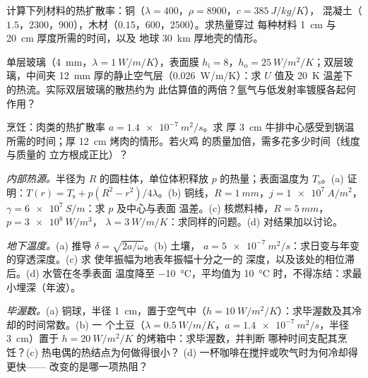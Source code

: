 \begin{exercise}[$\star$]\label{exo:b2:heat-conduction:2}
计算下列材料的热扩散率：铜（$\lambda = 400$，$\rho = 8900$，$c = \qty{385}{J/kg/K}$），
混凝土（$1.5$，$2300$，$900$），木材（$0.15$，$600$，$2500$）。求热量穿过
每种材料 \qty{1}{cm} 与 \qty{20}{cm} 厚度所需的时间，以及
地球 \qty{30}{km} 厚地壳的情形。
\end{exercise}

\begin{exercise}[$\star$]\label{exo:b2:heat-conduction:3}
单层玻璃（\qty{4}{mm}，$\lambda = \qty{1}{W/m/K}$），表面膜 $h_{\text{i}}
= 8$，$h_{\text{o}} = \qty{25}{W/m^2/K}$；双层玻璃，中间夹 \qty{12}{mm}
厚的静止空气层（\qty{0.026}{W/m/K}）：求 $U$ 值及
\qty{20}{K} 温差下的热流。实际双层玻璃的散热约为
此估算值的两倍？氩气与低发射率镀膜各起何作用？
\end{exercise}

\begin{exercise}[$\star$]\label{exo:b2:heat-conduction:4}
烹饪：肉类的热扩散率 $a = \qty{1.4e-7}{m^2/s}$。求
厚 \qty{3}{cm} 牛排中心感受到锅温所需的时间；厚 \qty{12}{cm} 烤肉的情形。若火鸡
的质量加倍，需多花多少时间（线度与质量的
立方根成正比）？
\end{exercise}

\begin{exercise}[$\star\star$]\label{exo:b2:heat-conduction:5}
\emph{内部热源。}半径为 $R$ 的圆柱体，单位体积释放 $p$
的热量；表面温度为 $T_{\text{s}}$。(a) 证明：$T(r) = T_{\text{s}} +
p(R^2 - r^2)/4\lambda$。(b) 铜线，$R = \qty{1}{mm}$，$j =
\qty{1e7}{A/m^2}$，$\gamma = \qty{6e7}{S/m}$：求 $p$ 及中心与表面
温差。(c) 核燃料棒，$R = \qty{5}{mm}$，$p = \qty{3e8}{W/m^3}$，
$\lambda = \qty{3}{W/m/K}$：求同样的问题。(d) 对结果加以讨论。
\end{exercise}

\begin{exercise}[$\star\star$]\label{exo:b2:heat-conduction:6}
\emph{地下温度。}(a) 推导 $\delta = \sqrt{2a/\omega}$。(b) 土壤，
$a = \qty{5e-7}{m^2/s}$：求日变与年变的穿透深度。(c) 求
使年振幅为地表年振幅十分之一的
深度，以及该处的相位滞后。(d) 水管在冬季表面
温度降至 \qty{-10}{\celsius}，平均值为
\qty{10}{\celsius} 时，不得冻结：求最小埋深（年波）。
\end{exercise}

\begin{exercise}[$\star\star$]\label{exo:b2:heat-conduction:7}
\emph{毕渥数。}(a) 铜球，半径 \qty{1}{cm}，置于空气中（$h =
\qty{10}{W/m^2/K}$）：求毕渥数及其冷却的时间常数。(b) 一
个土豆（$\lambda = \qty{0.5}{W/m/K}$，$a = \qty{1.4e-7}{m^2/s}$，半径
\qty{3}{cm}）置于 $h = \qty{20}{W/m^2/K}$ 的烤箱中：求毕渥数，并判断
哪种时间支配其烹饪？(c) 热电偶的热结点为何做得很小？
(d) 一杯咖啡在搅拌或吹气时为何冷却得更快——
改变的是哪一项热阻？
\end{exercise}

